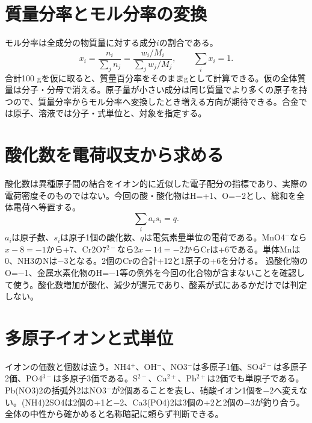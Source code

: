 \section{質量分率とモル分率の変換}
\label{theory:basicchem:fraction}
モル分率は全成分の物質量に対する成分\(i\)の割合である\autocite{iupac_amount_fraction}。
\begin{equation}x_i=\frac{n_i}{\sum_jn_j}=\frac{w_i/M_i}{\sum_j w_j/M_j},\qquad\sum_i x_i=1.\end{equation}
合計100 gを仮に取ると、質量百分率をそのままgとして計算できる。仮の全体質量は分子・分母で消える。原子量が小さい成分は同じ質量でより多くの原子を持つので、質量分率からモル分率へ変換したとき増える方向が期待できる。合金では原子、溶液では分子・式単位と、対象を指定する。

\section{酸化数を電荷収支から求める}
\label{theory:basicchem:oxidation}
酸化数は異種原子間の結合をイオン的に近似した電子配分の指標であり、実際の電荷密度そのものではない\autocite{iupac_oxidation_state}。今回の酸・酸化物はH=+1、O=−2とし、総和を全体電荷へ等置する。
\begin{equation}\sum_i a_i s_i=q.\end{equation}
\(a_i\)は原子数、\(s_i\)は原子1個の酸化数、\(q\)は電気素量単位の電荷である。MnO4\({}^-\)なら\(x-8=-1\)から+7、Cr2O7\({}^{2-}\)なら\(2x-14=-2\)からCrは+6である。単体Mnは0、NH3のNは−3となる。2個のCrの合計+12と1原子の+6を分ける。
過酸化物のO=−1、金属水素化物のH=−1等の例外を今回の化合物が含まないことを確認して使う。酸化数増加が酸化、減少が還元であり、酸素が式にあるかだけでは判定しない。

\section{多原子イオンと式単位}
\label{theory:basicchem:ion}
イオンの価数と個数は違う。NH4\({}^+\)、OH\({}^-\)、NO3\({}^-\)は多原子1価、SO4\({}^{2-}\)は多原子2価、PO4\({}^{3-}\)は多原子3価である。S\({}^{2-}\)、Ca\({}^{2+}\)、Pb\({}^{2+}\)は2価でも単原子である。
Pb(NO3)2の括弧外2はNO3\({}^-\)が2個あることを表し、硝酸イオン1個を−2へ変えない。(NH4)2SO4は2個の+1と−2、Ca3(PO4)2は3個の+2と2個の−3が釣り合う。全体の中性から確かめると名称暗記に頼らず判断できる。

